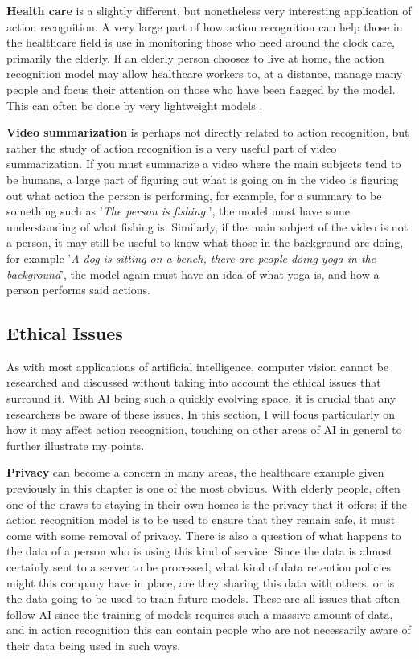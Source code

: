 \textbf{Health care} is a slightly different, but nonetheless very interesting application of action recognition. A very large part of how action recognition can help those in the healthcare field is use in monitoring those who need around the clock care, primarily the elderly. If an elderly person chooses to live at home, the action recognition model may allow healthcare workers to, at a distance, manage many people and focus their attention on those who have been flagged by the model. This can often be done by very lightweight models \cite{Eldermonitoring}.

\textbf{Video summarization} is perhaps not directly related to action recognition, but rather the study of action recognition is a very useful part of video summarization. If you must summarize a video where the main subjects tend to be humans, a large part of figuring out what is going on in the video is figuring out what action the person is performing, for example, for a summary to be something such as '\textit{The person is fishing.}', the model must have some understanding of what fishing is. Similarly, if the main subject of the video is not a person, it may still be useful to know what those in the background are doing, for example '\textit{A dog is sitting on a bench, there are people doing yoga in the background}', the model again must have an idea of what yoga is, and how a person performs said actions.

\subsection{Ethical Issues}

As with most applications of artificial intelligence, computer vision cannot be researched and discussed without taking into account the ethical issues that surround it. With AI being such a quickly evolving space, it is crucial that any researchers be aware of these issues. In this section, I will focus particularly on how it may affect action recognition, touching on other areas of AI in general to further illustrate my points.

\textbf{Privacy} can become a concern in many areas, the healthcare example given previously in this chapter is one of the most obvious. With elderly people, often one of the draws to staying in their own homes is the privacy that it offers; if the action recognition model is to be used to ensure that they remain safe, it must come with some removal of privacy. There is also a question of what happens to the data of a person who is using this kind of service. Since the data is almost certainly sent to a server to be processed, what kind of data retention policies might this company have in place, are they sharing this data with others, or is the data going to be used to train future models. These are all issues that often follow AI since the training of models requires such a massive amount of data, and in action recognition this can contain people who are not necessarily aware of their data being used in such ways.

